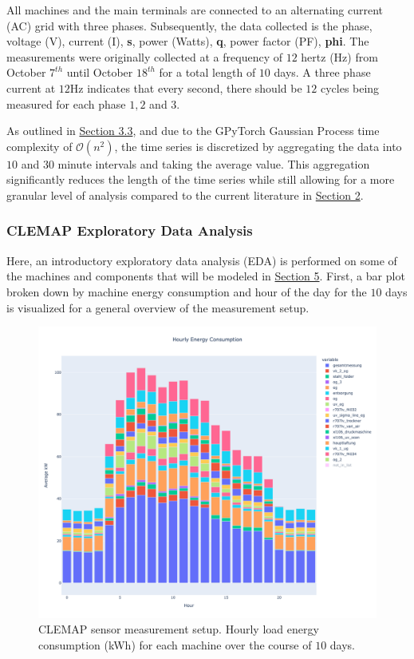 All machines and the main terminals are connected to an alternating current (AC) grid with three phases. Subsequently, the data collected is the phase, voltage (V), current (I), \textbf{s}, power (Watts), \textbf{q}, power factor (PF), \textbf{phi}. The measurements were originally collected at a frequency of $12$ hertz (Hz) from October $7^{th}$ until October $18^{th}$ for a total length of $10$ days. A three phase current at $12$Hz indicates that every second, there should be $12$ cycles being measured for each phase $1, 2$ and $3$. 

As outlined in \hyperlink{subsection.3.3}{Section 3.3}, and due to the GPyTorch Gaussian Process time complexity of $\mathcal{O}(n^2)$, the time series is discretized by aggregating the data into $10$ and $30$ minute intervals and taking the average value. This aggregation significantly reduces the length of the time series while still allowing for a more granular level of analysis compared to the current literature in \hyperlink{section.2}{Section 2}.

\subsubsection{CLEMAP Exploratory Data Analysis}

Here, an introductory exploratory data analysis (EDA) is performed on some of the machines and components that will be modeled in \hyperlink{section.5}{Section 5}. First, a bar plot broken down by machine energy consumption and hour of the day for the $10$ days is visualized for a general overview of the measurement setup.

\begin{figure}[htp]
\centering
\graphicspath{ {./images/} }
\includegraphics[scale=0.41]{images/hourly_load_barplot.png}
\caption{CLEMAP sensor measurement setup. Hourly load energy consumption (kWh) for each machine over the course of $10$ days.}
\end{figure}

